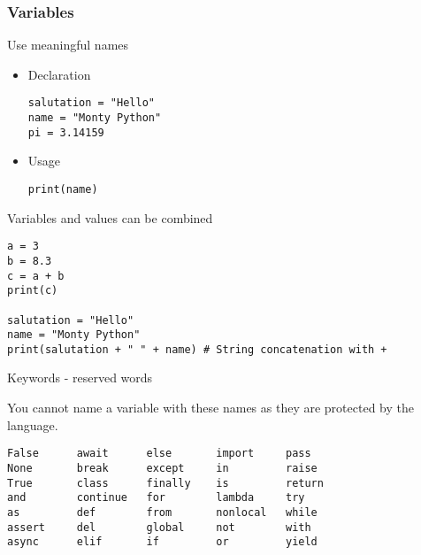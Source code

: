 \documentclass[10pt, a4paper]{beamer} %
\begin{document}
\begin{frame}
	\frametitle{Variables}
	\begin{examples}
		Use meaningful names
		\begin{itemize}
			\item Declaration
			      \begin{lstlisting}
salutation = "Hello"
name = "Monty Python"
pi = 3.14159
            \end{lstlisting}
			\item Usage
			      \begin{lstlisting}
print(name)
            \end{lstlisting}
		\end{itemize}

	\end{examples}
	\framebreak
	\begin{block}{Variables and values can be combined}
		\begin{lstlisting}
a = 3
b = 8.3
c = a + b
print(c)

salutation = "Hello"
name = "Monty Python"
print(salutation + " " + name) # String concatenation with +
    \end{lstlisting}
	\end{block}
	\framebreak
	\begin{block}{Keywords - reserved words}

		You cannot name a variable with these names as they are protected by the language.

		\begin{lstlisting}
False      await      else       import     pass
None       break      except     in         raise
True       class      finally    is         return
and        continue   for        lambda     try
as         def        from       nonlocal   while
assert     del        global     not        with
async      elif       if         or         yield
    \end{lstlisting}

	\end{block}
\end{frame}
\end{document}
